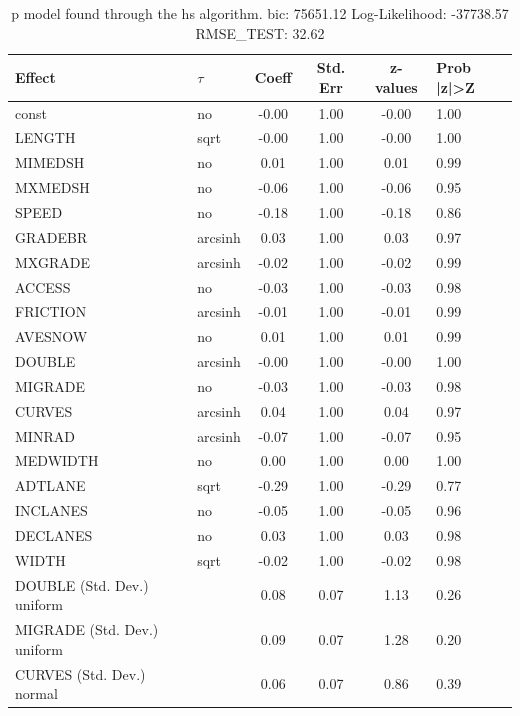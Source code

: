 \begin{table}
	\caption{p model found through the hs algorithm. bic: 75651.12 Log-Likelihood: -37738.57 RMSE_TEST: 32.62}
	\begin{center}
		\begin{tabular}{|l|l|c|c|c|l|}
			\hline
			Effect & $\tau$ & Coeff & Std. Err & z-values & Prob |z|>Z \\
			\hline
			const & no & -0.00 & 1.00 & -0.00 & 1.00 \\
			\hline
			LENGTH & sqrt & -0.00 & 1.00 & -0.00 & 1.00 \\
			\hline
			MIMEDSH & no & 0.01 & 1.00 & 0.01 & 0.99 \\
			\hline
			MXMEDSH & no & -0.06 & 1.00 & -0.06 & 0.95 \\
			\hline
			SPEED & no & -0.18 & 1.00 & -0.18 & 0.86 \\
			\hline
			GRADEBR & arcsinh & 0.03 & 1.00 & 0.03 & 0.97 \\
			\hline
			MXGRADE & arcsinh & -0.02 & 1.00 & -0.02 & 0.99 \\
			\hline
			ACCESS & no & -0.03 & 1.00 & -0.03 & 0.98 \\
			\hline
			FRICTION & arcsinh & -0.01 & 1.00 & -0.01 & 0.99 \\
			\hline
			AVESNOW & no & 0.01 & 1.00 & 0.01 & 0.99 \\
			\hline
			DOUBLE & arcsinh & -0.00 & 1.00 & -0.00 & 1.00 \\
			\hline
			MIGRADE & no & -0.03 & 1.00 & -0.03 & 0.98 \\
			\hline
			CURVES & arcsinh & 0.04 & 1.00 & 0.04 & 0.97 \\
			\hline
			MINRAD & arcsinh & -0.07 & 1.00 & -0.07 & 0.95 \\
			\hline
			MEDWIDTH & no & 0.00 & 1.00 & 0.00 & 1.00 \\
			\hline
			ADTLANE & sqrt & -0.29 & 1.00 & -0.29 & 0.77 \\
			\hline
			INCLANES & no & -0.05 & 1.00 & -0.05 & 0.96 \\
			\hline
			DECLANES & no & 0.03 & 1.00 & 0.03 & 0.98 \\
			\hline
			WIDTH & sqrt & -0.02 & 1.00 & -0.02 & 0.98 \\
			\hline
			DOUBLE (Std. Dev.) uniform &  & 0.08 & 0.07 & 1.13 & 0.26 \\
			\hline
			MIGRADE (Std. Dev.) uniform &  & 0.09 & 0.07 & 1.28 & 0.20 \\
			\hline
			CURVES (Std. Dev.) normal &  & 0.06 & 0.07 & 0.86 & 0.39 \\

\end{tabular}
\end{center}
\end{table}
